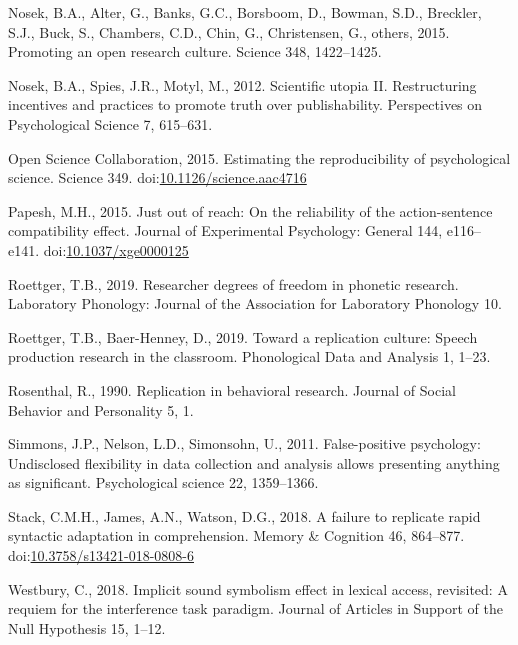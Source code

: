 \documentclass[]{elsarticle} %
\newlength{\cslhangindent}
\newlength{\cslentryspacingunit} %
\newenvironment{CSLReferences}[2] %
 {%
  \setlength{\parindent}{0pt}
  \ifodd #1
  \let\oldpar\par
  \def\par{\hangindent=\cslhangindent\oldpar}
  \fi
  \setlength{\parskip}{#2\cslentryspacingunit}
 }%
 {}
\begin{document}
\begin{CSLReferences}{1}{0}
\leavevmode\hypertarget{ref-nosek2015promoting}{}%
Nosek, B.A., Alter, G., Banks, G.C., Borsboom, D., Bowman, S.D., Breckler, S.J., Buck, S., Chambers, C.D., Chin, G., Christensen, G., others, 2015. Promoting an open research culture. Science 348, 1422--1425.

\leavevmode\hypertarget{ref-nosek_scientific_2012}{}%
Nosek, B.A., Spies, J.R., Motyl, M., 2012. Scientific utopia {II}. {Restructuring} incentives and practices to promote truth over publishability. Perspectives on Psychological Science 7, 615--631.

\leavevmode\hypertarget{ref-open_science_collaboration_estimating_2015}{}%
Open Science Collaboration, 2015. Estimating the reproducibility of psychological science. Science 349. doi:\href{https://doi.org/10.1126/science.aac4716}{10.1126/science.aac4716}

\leavevmode\hypertarget{ref-papesh_just_2015}{}%
Papesh, M.H., 2015. Just out of reach: {On} the reliability of the action-sentence compatibility effect. Journal of Experimental Psychology: General 144, e116--e141. doi:\href{https://doi.org/10.1037/xge0000125}{10.1037/xge0000125}

\leavevmode\hypertarget{ref-roettger2019researcher}{}%
Roettger, T.B., 2019. Researcher degrees of freedom in phonetic research. Laboratory Phonology: Journal of the Association for Laboratory Phonology 10.

\leavevmode\hypertarget{ref-roettger_toward_2019}{}%
Roettger, T.B., Baer-Henney, D., 2019. Toward a replication culture: {Speech} production research in the classroom. Phonological Data and Analysis 1, 1--23.

\leavevmode\hypertarget{ref-rosenthal_replication_1990}{}%
Rosenthal, R., 1990. Replication in behavioral research. Journal of Social Behavior and Personality 5, 1.

\leavevmode\hypertarget{ref-simmons2011false}{}%
Simmons, J.P., Nelson, L.D., Simonsohn, U., 2011. False-positive psychology: Undisclosed flexibility in data collection and analysis allows presenting anything as significant. Psychological science 22, 1359--1366.

\leavevmode\hypertarget{ref-stack_failure_2018}{}%
Stack, C.M.H., James, A.N., Watson, D.G., 2018. A failure to replicate rapid syntactic adaptation in comprehension. Memory \& Cognition 46, 864--877. doi:\href{https://doi.org/10.3758/s13421-018-0808-6}{10.3758/s13421-018-0808-6}

\leavevmode\hypertarget{ref-westbury_implicit_2018}{}%
Westbury, C., 2018. Implicit sound symbolism effect in lexical access, revisited: {A} requiem for the interference task paradigm. Journal of Articles in Support of the Null Hypothesis 15, 1--12.


\end{CSLReferences}
\end{document}
